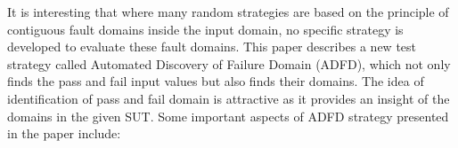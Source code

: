 






It is interesting that where many random strategies are based on the principle of contiguous fault domains inside the input domain, no specific strategy is developed to evaluate these fault domains. This paper describes a new test strategy called Automated Discovery of Failure Domain (ADFD), which not only finds the pass and fail input values but also finds their domains. The idea of identification of pass and fail domain is attractive as it provides an insight of the domains in the given SUT. Some important aspects of ADFD strategy presented in the paper include:

